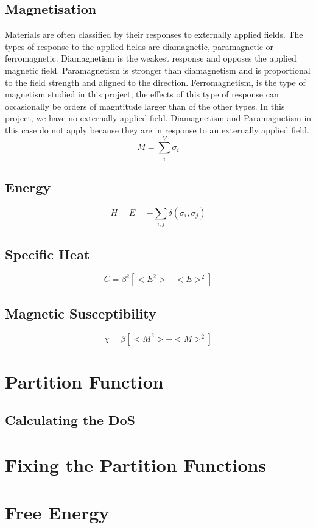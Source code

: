 	\subsection{Magnetisation}
	Materials are often classified by their responses to externally applied fields.
	The types of response to the applied fields are diamagnetic, paramagnetic or ferromagnetic.
	Diamagnetism is the weakest response and opposes the applied magnetic field.
	Paramagnetism is stronger than diamagnetism and is proportional to the field strength and aligned to the direction.
	Ferromagnetism, is the type of magnetism studied in this project, the effects of this type of response can occasionally be orders of magntitude larger than of the other types.
	In this project, we have no externally applied field.
	Diamagnetism and Paramagnetism in this case do not apply because they are in response to an externally applied field.
	\begin{equation}
		M=\sum_{i}^{V}\sigma_{i}
	\end{equation}

	\subsection{Energy}
	\begin{equation}
		H=E=-\sum_{i,j}\delta (\sigma_i,\sigma_j)
	\end{equation}

	\subsection{Specific Heat}
	\begin{equation}
		C=\beta^2[<E^2>-<E>^2]
	\end{equation}

	\subsection{Magnetic Susceptibility}
	\begin{equation}
		\chi=\beta[<M^2>-<M>^2]
	\end{equation}

\section{Partition Function}

	\subsection{Calculating the DoS}

\section{Fixing the Partition Functions}

\section{Free Energy}
